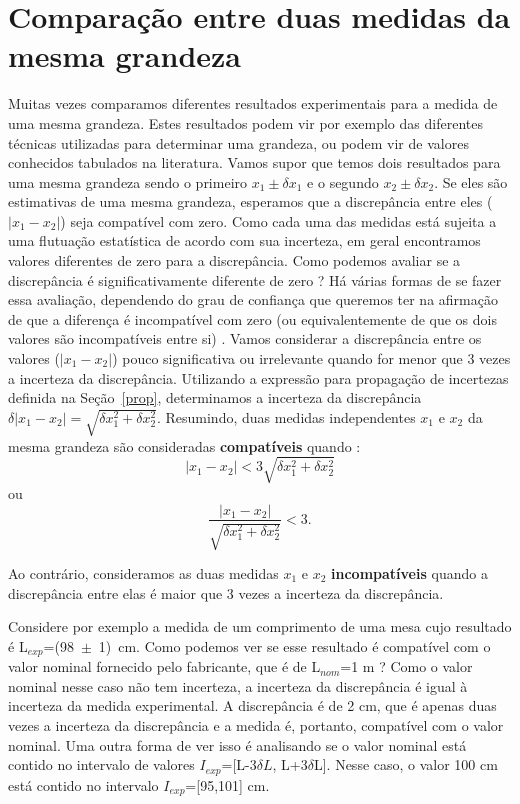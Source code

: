 \section*{Compara\c c\~ao entre duas medidas da mesma grandeza}
Muitas vezes comparamos diferentes resultados experimentais para a medida de uma mesma grandeza.  Estes resultados podem vir por exemplo das diferentes técnicas utilizadas para determinar uma grandeza, ou podem vir de valores conhecidos tabulados na literatura. Vamos supor que temos dois resultados para uma mesma grandeza sendo o primeiro $x_1 \pm \delta{x_1}$ e o segundo $x_2 \pm \delta{x_2}$.  Se eles são estimativas de uma mesma grandeza, esperamos que a discrepância entre eles ($|x_1-x_2|$) seja compatível com zero. Como cada uma das medidas está sujeita a uma flutuação estatística de acordo com sua incerteza, em geral encontramos valores diferentes de zero para a discrepância. Como podemos avaliar se a discrepância é significativamente diferente de zero ?  Há várias formas de se fazer essa avaliação, dependendo do grau de confiança que queremos ter na afirmação de que a diferença é incompatível com zero (ou equivalentemente de que os dois valores são incompatíveis entre si) . Vamos considerar a discrepância entre os valores ($|x_1-x_2|$) pouco significativa ou irrelevante quando for menor que 3 vezes a incerteza da discrepância. Utilizando a expressão para propagação de incertezas definida na Seção~\ref{prop}, determinamos a incerteza da discrepância $\delta |x_1-x_2|=\sqrt{\delta x^2_1+\delta x^2_2}$. Resumindo, duas medidas independentes $x_1$ e $x_2$ da mesma grandeza são consideradas {\bf  compatíveis} quando : 
$$|x_1 - x_2| < 3 \sqrt{\delta x^2_1+\delta x^2_2}$$ 
ou
$$\frac{|x_1 - x_2|}{\sqrt{\delta x^2_1+\delta x^2_2}}<3.$$

Ao contrário, consideramos as duas medidas $x_1$ e $x_2$ {\bf incompatíveis} quando a discrepância entre elas é maior que 3 vezes a incerteza da discrepância. 

 Considere por exemplo a medida de um comprimento de uma mesa cujo resultado é L$_{exp}$=(98~$\pm$~1)~cm. Como podemos ver se esse resultado é compatível com o valor nominal fornecido pelo fabricante, que é de L$_{nom}$=1 m ? 
Como o valor nominal nesse caso não tem incerteza, a incerteza  da discrepância é igual à incerteza da medida experimental. A discrepância é de 2 cm, que é apenas duas vezes a incerteza da discrepância e a medida é, portanto, compatível com o valor nominal. Uma outra forma de ver isso \'e analisando se o valor nominal est\'a contido no intervalo de valores $I_{exp}$=[L-3$\delta L$, L+3$\delta$L]. Nesse caso, o valor 100 cm est\'a contido no intervalo $I_{exp}$=[95,101] cm.

